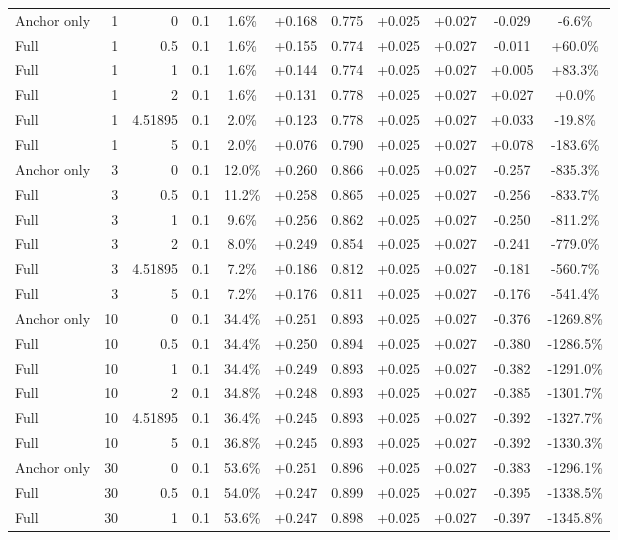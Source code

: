 \begin{table}[htbp]
\begin{tabular}{lrrrccccccc}
Anchor only & 1 & 0 & 0.1 & 1.6\% & +0.168 & 0.775 & +0.025 & +0.027 & -0.029 & -6.6\% \\
Full & 1 & 0.5 & 0.1 & 1.6\% & +0.155 & 0.774 & +0.025 & +0.027 & -0.011 & +60.0\% \\
Full & 1 & 1 & 0.1 & 1.6\% & +0.144 & 0.774 & +0.025 & +0.027 & +0.005 & +83.3\% \\
Full & 1 & 2 & 0.1 & 1.6\% & +0.131 & 0.778 & +0.025 & +0.027 & +0.027 & +0.0\% \\
Full & 1 & 4.51895 & 0.1 & 2.0\% & +0.123 & 0.778 & +0.025 & +0.027 & +0.033 & -19.8\% \\
Full & 1 & 5 & 0.1 & 2.0\% & +0.076 & 0.790 & +0.025 & +0.027 & +0.078 & -183.6\% \\
Anchor only & 3 & 0 & 0.1 & 12.0\% & +0.260 & 0.866 & +0.025 & +0.027 & -0.257 & -835.3\% \\
Full & 3 & 0.5 & 0.1 & 11.2\% & +0.258 & 0.865 & +0.025 & +0.027 & -0.256 & -833.7\% \\
Full & 3 & 1 & 0.1 & 9.6\% & +0.256 & 0.862 & +0.025 & +0.027 & -0.250 & -811.2\% \\
Full & 3 & 2 & 0.1 & 8.0\% & +0.249 & 0.854 & +0.025 & +0.027 & -0.241 & -779.0\% \\
Full & 3 & 4.51895 & 0.1 & 7.2\% & +0.186 & 0.812 & +0.025 & +0.027 & -0.181 & -560.7\% \\
Full & 3 & 5 & 0.1 & 7.2\% & +0.176 & 0.811 & +0.025 & +0.027 & -0.176 & -541.4\% \\
Anchor only & 10 & 0 & 0.1 & 34.4\% & +0.251 & 0.893 & +0.025 & +0.027 & -0.376 & -1269.8\% \\
Full & 10 & 0.5 & 0.1 & 34.4\% & +0.250 & 0.894 & +0.025 & +0.027 & -0.380 & -1286.5\% \\
Full & 10 & 1 & 0.1 & 34.4\% & +0.249 & 0.893 & +0.025 & +0.027 & -0.382 & -1291.0\% \\
Full & 10 & 2 & 0.1 & 34.8\% & +0.248 & 0.893 & +0.025 & +0.027 & -0.385 & -1301.7\% \\
Full & 10 & 4.51895 & 0.1 & 36.4\% & +0.245 & 0.893 & +0.025 & +0.027 & -0.392 & -1327.7\% \\
Full & 10 & 5 & 0.1 & 36.8\% & +0.245 & 0.893 & +0.025 & +0.027 & -0.392 & -1330.3\% \\
Anchor only & 30 & 0 & 0.1 & 53.6\% & +0.251 & 0.896 & +0.025 & +0.027 & -0.383 & -1296.1\% \\
Full & 30 & 0.5 & 0.1 & 54.0\% & +0.247 & 0.899 & +0.025 & +0.027 & -0.395 & -1338.5\% \\
Full & 30 & 1 & 0.1 & 53.6\% & +0.247 & 0.898 & +0.025 & +0.027 & -0.397 & -1345.8\% \\

\end{tabular}
\end{table}
